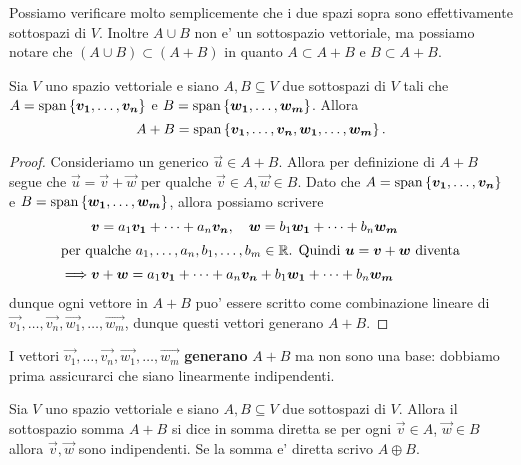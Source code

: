 \begin{remark}
    Possiamo verificare molto semplicemente che i due spazi sopra sono effettivamente sottospazi di $V$. Inoltre $A \cup B$ non e' un sottospazio vettoriale, ma possiamo notare che $(A \cup B) \subset (A + B)$ in quanto $A \subset A + B$ e $B \subset A + B$.
\end{remark}

\begin{proposition}
    Sia $V$ uno spazio vettoriale e siano $A, B \subseteq V$ due sottospazi di $V$ tali che $A = \operatorname{span}\left\{\bm{v_1}, \dots, \bm{v_n}\right\}$ e $B = \operatorname{span}\left\{\bm{w_1}, \dots, \bm{w_m}\right\}$. Allora \begin{equation}
        A + B = \operatorname{span}\left\{\bm{v_1}, \dots, \bm{v_n}, \bm{w_1}, \dots, \bm{w_m}\right\}.
    \end{equation}
\end{proposition}
\begin{proof}
    Consideriamo un generico $\vec u \in A + B$. Allora per definizione di $A + B$ segue che $\vec u = \vec v + \vec w$ per qualche $\vec v \in A, \vec w \in B$.
    Dato che $A = \operatorname{span}\left\{\bm{v_1}, \dots, \bm{v_n}\right\}$ e $B = \operatorname{span}\left\{\bm{w_1}, \dots, \bm{w_m}\right\}$, allora possiamo scrivere 
    \begin{alignat*}{1}
        &\bm{v} = a_1\bm{v_1} + \dots + a_n\bm{v_n},  \quad \bm{w} = b_1\bm{w_1} + \dots + b_n\bm{w_m} \\
        \intertext{per qualche $a_1, \dots, a_n, b_1, \dots, b_m \in \mathbb{R}$. Quindi $\bm{u} = \bm{v} + \bm{w}$ diventa}
        \implies &\bm{v} + \bm{w} = a_1\bm{v_1} + \dots + a_n\bm{v_n} + b_1\bm{w_1} + \dots + b_n\bm{w_m}
    \end{alignat*}
    dunque ogni vettore in $A + B$ puo' essere scritto come combinazione lineare di $\vec{v_1}, \dots, \vec{v_n}, \vec{w_1}, \dots, \vec{w_m}$, dunque questi vettori generano $A + B$. 
\end{proof}

\begin{remark}
    I vettori $\vec{v_1}, \dots, \vec{v_n}, \vec{w_1}, \dots, \vec{w_m}$ \textbf{generano} $A+B$ ma non sono una base: dobbiamo prima assicurarci che siano linearmente indipendenti.
\end{remark}

\begin{definition}
    Sia $V$ uno spazio vettoriale e siano $A, B \subseteq V$ due sottospazi di $V$. Allora il sottospazio somma $A + B$ si dice in somma diretta se per ogni $\vec v \in A$, $\vec w \in B$ allora $\vec v, \vec w$ sono indipendenti. Se la somma e' diretta scrivo $A \oplus B$.
\end{definition}

